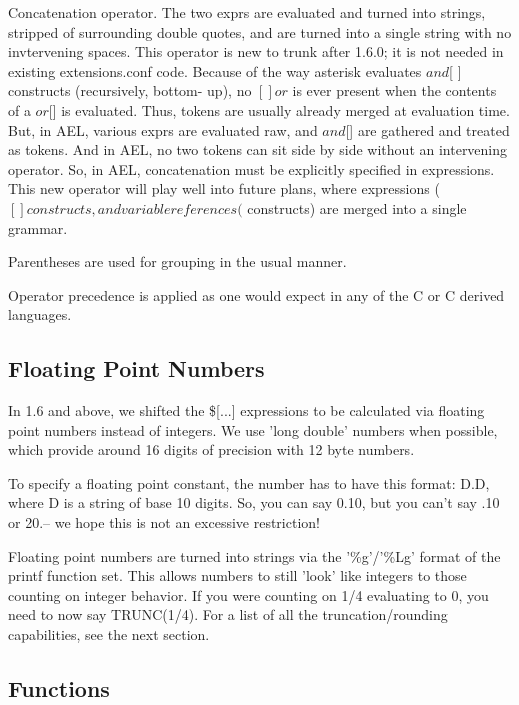 \begin{itemize}
	Concatenation operator. The two exprs are evaluated and
	turned into strings, stripped of surrounding double quotes,
        and are turned into a single string with no invtervening spaces. 
        This operator is new to trunk after 1.6.0; it is not needed 
	in existing extensions.conf code. Because of the way asterisk
	evaluates ${ } and $[ ] constructs (recursively, bottom-
	up), no $[] or ${} is ever present when the contents
	of a ${} or $[] is evaluated. Thus, tokens are usually
	already merged at evaluation time. But, in AEL, various
	exprs are evaluated raw, and ${} and $[] are gathered
	and treated as tokens. And in AEL, no two tokens can
	sit side by side without an intervening operator.
	So, in AEL, concatenation must be explicitly specified
	in expressions. This new operator will play well into
	future plans, where expressions ($[] constructs, and
	variable references (${} constructs) are merged into a 
	single grammar. 

\end{itemize}

Parentheses are used for grouping in the usual manner.

Operator precedence is applied as one would expect in any of the C
or C derived languages.

\subsection{Floating Point Numbers}

In 1.6 and above, we shifted the \$[...] expressions to be calculated
via floating point numbers instead of integers. We use 'long double' numbers
when possible, which provide around 16 digits of precision with 12 byte numbers.

To specify a floating point constant, the number has to have this format: D.D, where D is
a string of base 10 digits. So, you can say 0.10, but you can't say .10 or 20.-- we hope
this is not an excessive restriction!

Floating point numbers are turned into strings via the '\%g'/'\%Lg' format of the printf
function set. This allows numbers to still 'look' like integers to those counting
on integer behavior. If you were counting on 1/4 evaluating to 0, you need to now say
TRUNC(1/4). For a list of all the truncation/rounding capabilities, see the next section.


\subsection{Functions}

